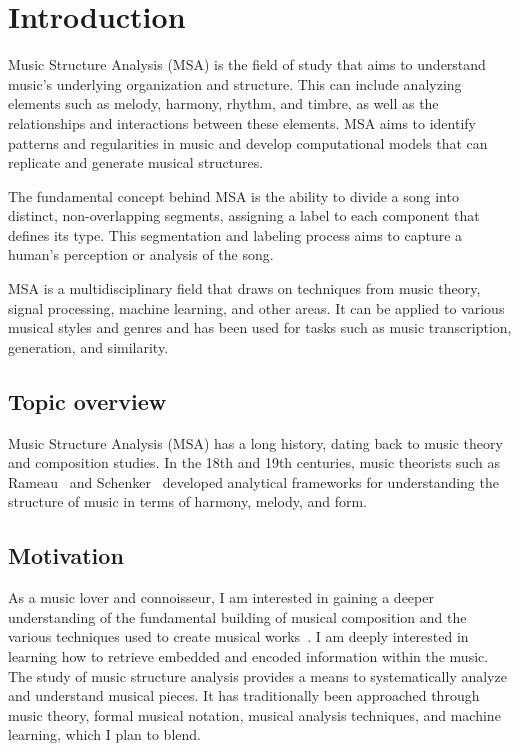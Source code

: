 \normallinespacing

\chapter{Introduction}

Music Structure Analysis (MSA) is the field of study that aims to understand music's underlying organization and structure. This can include analyzing elements such as melody, harmony, rhythm, and timbre, as well as the relationships and interactions between these elements. MSA aims to identify patterns and regularities in music and develop computational models that can replicate and generate musical structures.

The fundamental concept behind MSA is the ability to divide a song into distinct, non-overlapping segments, assigning a label to each component that defines its type. This segmentation and labeling process aims to capture a human's perception or analysis of the song.

MSA is a multidisciplinary field that draws on techniques from music theory, signal processing, machine learning, and other areas. It can be applied to various musical styles and genres and has been used for tasks such as music transcription, generation, and similarity. 

\section{Topic overview}

Music Structure Analysis (MSA) has a long history, dating back to music theory and composition studies. In the 18th and 19th centuries, music theorists such as Rameau~\cite{christensen2004rameau} and Schenker~\cite{schenkerdocumentsonline} developed analytical frameworks for understanding the structure of music in terms of harmony, melody, and form.

\section{Motivation}

As a music lover and connoisseur, I am interested in gaining a deeper understanding of the fundamental building of musical composition and the various techniques used to create musical works~\cite{choi2017convolutional}. I am deeply interested in learning how to retrieve embedded and encoded information within the music. The study of music structure analysis provides a means to systematically analyze and understand musical pieces. It has traditionally been approached through music theory, formal musical notation, musical analysis techniques, and machine learning, which I plan to blend.

